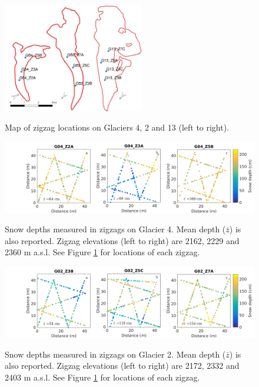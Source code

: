 \documentclass{sfuthesis}
\begin{document}
\begin{figure}[H]
	\centering
	\includegraphics[width = 0.55\textwidth]{map_zigzaglocation_all.jpeg}\\
	\caption{Map of zigzag locations on Glaciers 4, 2 and 13 (left to right).}
	\label{fig:ZZ_locations}
\end{figure}

\begin{landscape}
\begin{figure}
	\centering
	\includegraphics[width = 21 cm]{ZigzagDepth_G04.png}\\
	\caption{Snow depths measured in zigzags on Glacier 4. Mean depth ($\bar{z}$) is also reported. Zigzag elevations (left to right) are 2162, 2229 and 2360 m a.s.l. See Figure \ref{fig:ZZ_locations} for locations of each zigzag.}
	\label{fig:ZZ_G04}
\end{figure}

\begin{figure}
	\centering
	\includegraphics[width = 21 cm]{ZigzagDepth_G02.png}\\
	\caption{Snow depths measured in  zigzags on Glacier 2. Mean depth ($\bar{z}$) is also reported. Zigzag elevations (left to right) are 2172, 2332 and 2403 m a.s.l. See Figure \ref{fig:ZZ_locations} for locations of each zigzag.}
	\label{fig:ZZ_G02}
\end{figure}
\end{landscape}
\end{document}
